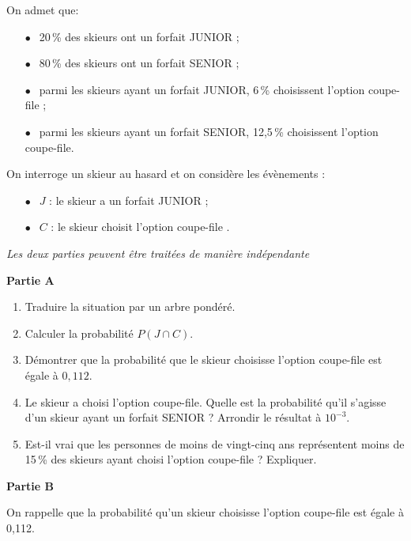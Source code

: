 \documentclass[11pt,a4paper,french]{article}
\begin{document}
On admet que:
\begin{itemize}
\item[$\bullet~~$] 20\,\% des skieurs ont un forfait JUNIOR ;
\item[$\bullet~~$] 80\,\% des skieurs ont un forfait SENIOR ;
\item[$\bullet~~$] parmi les skieurs ayant un forfait JUNIOR, 6\,\% choisissent l'option coupe-file ;
\item[$\bullet~~$] parmi les skieurs ayant un forfait SENIOR, 12,5\,\% choisissent l'option coupe-file.
\end{itemize}

On interroge un skieur au hasard et on considère les évènements :

\begin{itemize}
\item[$\bullet~~$] $J$ : \og le skieur a un forfait JUNIOR \fg ;
\item[$\bullet~~$] $C$ : \og le skieur choisit l'option coupe-file \fg.
\end{itemize}

\medskip

\emph{Les deux parties peuvent être traitées de manière indépendante}

\bigskip

\textbf{Partie A}

\medskip

\begin{enumerate}
\item Traduire la situation par un arbre pondéré.
\item Calculer la probabilité $P(J \cap C)$.
\item Démontrer que la probabilité que le skieur choisisse l'option coupe-file est égale à $0,112$.
\item Le skieur a choisi l'option coupe-file. Quelle est la probabilité qu'il s'agisse d'un
skieur ayant un forfait SENIOR ? Arrondir le résultat à $10^{-3}$.
\item Est-il vrai que les personnes de moins de vingt-cinq ans représentent moins de 15\,\% des skieurs ayant choisi l'option coupe-file ? Expliquer.
\end{enumerate}

\bigskip

\textbf{Partie B}

\medskip

On rappelle que la probabilité qu'un skieur choisisse l'option coupe-file est égale à 0,112.
\end{document}
